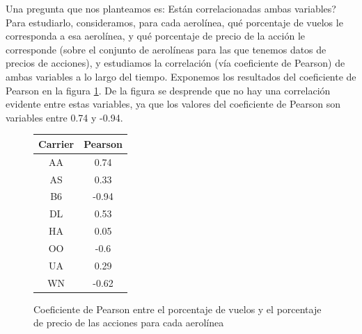 Una pregunta que nos planteamos es: \textquestiondown Est\'an correlacionadas ambas variables? Para
estudiarlo, consideramos, para cada aerol\'inea, qu\'e porcentaje de vuelos le corresponda a esa
aerol\'inea, y qu\'e porcentaje de precio de la acci\'on le corresponde (sobre el conjunto de aerol\'ineas para
las que tenemos datos de precios de acciones), y estudiamos la correlaci\'on (v\'ia coeficiente
de Pearson) de ambas variables a lo largo del tiempo. Exponemos los resultados del coeficiente de Pearson en la figura
\ref{table:pearson}. De la figura se desprende que no hay una correlaci\'on evidente entre estas variables,
ya que los valores del coeficiente de Pearson son variables entre 0.74 y -0.94.

\begin{figure}[hbtp]
\tiny
\begin{center}
  \begin{tabular}{||c || c ||}
 \hline
 Carrier & Pearson \\ [1ex]
 \hline\hline
 AA & 0.74 \\
 \hline
 AS & 0.33 \\
 \hline
 B6 & -0.94 \\
 \hline
 DL & 0.53 \\
 \hline
 HA & 0.05 \\
 \hline
 OO & -0.6 \\
 \hline
 UA & 0.29 \\
 \hline
 WN & -0.62 \\ [1ex]
 \hline
\end{tabular}
\end{center}
\caption{Coeficiente de Pearson entre el porcentaje de vuelos
y el porcentaje de precio de las acciones para cada aerol\'inea}
\label{table:pearson}
\end{figure}
